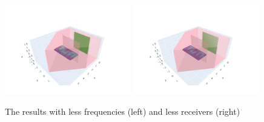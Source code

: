 \begin{figure}[h]
    \centering
    \includegraphics[width=0.49\textwidth]{figures/result_multipath_nlos_reduced_freq.pdf}
    \includegraphics[width=0.49\textwidth]{figures/result_multipath_nlos_reduced.pdf}
    \caption{The results with less frequencies (left) and less receivers (right)}\label{fig:MultipathNLOS_time_optimized}
\end{figure}

